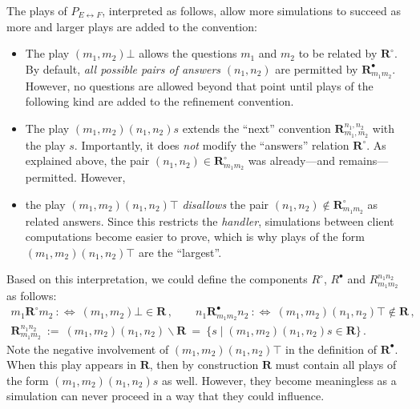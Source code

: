 \documentclass[acmsmall,nonacm]{acmart}
\begin{document}
The plays of $P_{E \leftrightarrow F}$, interpreted as follows,
allow more simulations to succeed as
more and larger plays are added to the convention:
\begin{itemize}
  \item The play $(m_1, m_2)\bot$
    allows the questions $m_1$ and $m_2$
    to be related by $\mathbf{R}^\circ$.
    By default,
    \emph{all possible pairs of answers} $(n_1, n_2)$
    are permitted by $\mathbf{R}^\bullet_{m_1m_2}$.
    However, no questions are allowed beyond that point
    until plays of the following kind are added to the refinement convention.
  \item The play $(m_1, m_2)(n_1,n_2) s$
    extends the ``next'' convention $\mathbf{R}^{n_1,n_2}_{m_1,m_2}$
    with the play $s$.
    Importantly, it does \emph{not} modify
    the ``answers'' relation $\mathbf{R}^\circ$.
    As explained above, the pair $(n_1, n_2) \in \mathbf{R}^\circ_{m_1m_2}$
    was already---and remains---permitted.
    However,
  \item the play $(m_1,m_2)(n_1,n_2) \top$ \emph{disallows} the pair
    $(n_1, n_2) \notin \mathbf{R}^\circ_{m_1m_2}$ as related answers.
    Since this restricts the \emph{handler},
    simulations between client computations become easier to prove,
    which is why plays of the form $(m_1,m_2)(n_1,n_2)\top$ are the ``largest''.
\end{itemize}
Based on this interpretation,
we could define the components $R^\circ$, $R^\bullet$
and $R_{m_1m_2}^{n_1n_2}$ as follows:
\begin{gather*}
  m_1 \mathrel{\mathbf{R}^\circ} m_2 \::\Leftrightarrow\:
    (m_1,m_2)\bot \in \mathbf{R}
  \,, \qquad
  n_1 \mathrel{\mathbf{R}^\bullet_{m_1m_2}} n_2 \::\Leftrightarrow\:
    (m_1,m_2)(n_1,n_2)\top \notin \mathbf{R}
  \,, \\[0.5ex]
  \mathbf{R}_{m_1m_2}^{n_1n_2} \: := \:
    (m_1,m_2)(n_1,n_2) \backslash \mathbf{R} \: = \:
    \{ s \mid (m_1,m_2)(n_1,n_2)s \in \mathbf{R} \}
  \,.
\end{gather*}
Note the negative involvement of $(m_1,m_2)(n_1,n_2)\top$
in the definition of $\mathbf{R}^\bullet$.
When this play appears in $\mathbf{R}$,
then by construction $\mathbf{R}$ must contain
all plays of the form $(m_1,m_2)(n_1,n_2)s$ as well.
However, they become meaningless
as a simulation can never proceed
in a way that they could influence.
\end{document}
